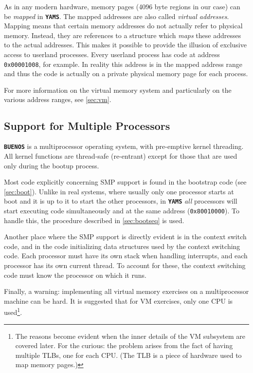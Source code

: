 \documentclass[twoside,a4paper]{report}
\newcommand{\buenos}{\texttt{\textbf{BUENOS}}}
\newcommand{\yams}{\texttt{\textbf{YAMS}}}
\begin{document}
As in any modern hardware, memory pages (4096 byte regions in our
case) can be \emph{mapped} in \yams{}. The mapped addresses are also
called \emph{virtual addresses}. Mapping means that certain memory
addresses do not actually refer to physical memory. Instead, they are
references to a structure which \emph{maps} these addresses to the
actual addresses. This makes it possible to provide the illusion of
exclusive access to userland processes. Every userland process has
code at address \texttt{0x00001008}, for example. In reality this
address is in the mapped address range and thus the code is actually
on a private physical memory page for each process.

For more information on the virtual memory system and particularly on
the various address ranges, see \autoref{sec:vm}.

\subsection{Support for Multiple Processors}
\label{sec:SMP}

\buenos{} is a multiprocessor operating system, with pre-emptive
kernel threading. All kernel functions are thread-safe (re-entrant)
except for those that are used only during the bootup process.

Most code explicitly concerning SMP support is found in the bootstrap
code (see \autoref{sec:boot}). Unlike in real systems, where usually
only one processor starts at boot and it is up to it to start the
other processors, in \yams{} \emph{all} processors will start
executing code simultaneously and at the same address
(\texttt{0x80010000}). To handle this, the procedure described in
\autoref{sec:bootseq} is used.

Another place where the SMP support is directly evident is in the
context switch code, and in the code initializing data structures used
by the context switching code. Each processor must have its own stack
when handling interrupts, and each processor has its own current
thread. To account for these, the context switching code must know the
processor on which it runs.

Finally, a warning: implementing all virtual memory exercises on a
multiprocessor machine can be hard. It is suggested that for VM
exercises, only one CPU is used\footnote{The reasons become evident
when the inner details of the VM subsystem are covered later. For the
curious: the problem arises from the fact of having multiple TLBs, one
for each CPU. (The TLB is a piece of hardware used to map memory pages.)}.
\end{document}
